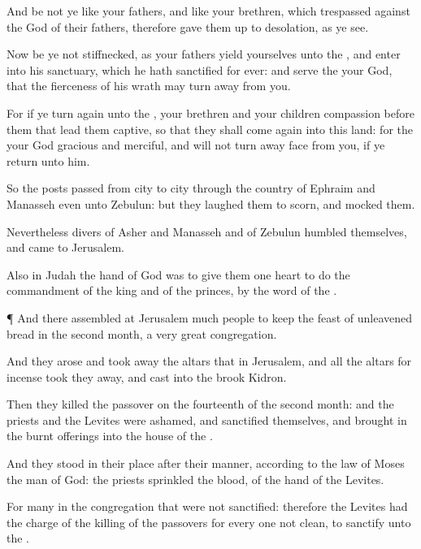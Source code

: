 {And be not ye like your
fathers, and like your
brethren, which
trespassed against the
{}
God of their
fathers,
{} therefore gave them
up to
desolation, as ye
see.

Now be ye not
stiffnecked, as your
fathers
{}
yield
yourselves unto the
{}, and
enter into his
sanctuary, which he hath
sanctified for
ever: and
serve the
{} your
God, that the
fierceness of his
wrath may turn
away from you.

For if ye turn
again unto the
{}, your
brethren and your
children
{}
compassion
before them that lead them
captive, so that they shall come
again into this
land: for the
{} your
God
{}
gracious and
merciful, and will not turn
away
{}
face from you, if ye
return unto him.

So the
posts
passed from
city to
city through the
country of
Ephraim and
Manasseh even unto
Zebulun: but they laughed them to
scorn, and
mocked them.

Nevertheless
divers of
Asher and
Manasseh and of
Zebulun
humbled themselves, and
came to
Jerusalem.

Also in
Judah the
hand of
God was to
give them
one
heart to
do the
commandment of the
king and of the
princes, by the
word of the
{}.


\par }{\PP {}¶ And there
assembled at
Jerusalem
much
people to
keep the
feast of unleavened
bread in the
second
month, a
very
great
congregation.

And they
arose and took
away the
altars that
{} in
Jerusalem, and all the altars for
incense took they
away, and
cast
{} into the
brook
Kidron.

Then they
killed the
passover on the
fourteenth
{} of the
second
month: and the
priests and the
Levites were
ashamed, and
sanctified themselves, and brought
in the burnt
offerings into the
house of the
{}.

And they
stood in their
place after their
manner, according to the
law of
Moses the
man of
God: the
priests
sprinkled the
blood,
{} of the
hand of the
Levites.

For
{}
many in the
congregation that were not
sanctified: therefore the
Levites had the charge of the
killing of the
passovers for every one
{} not
clean, to
sanctify
{} unto the
{}.

}
